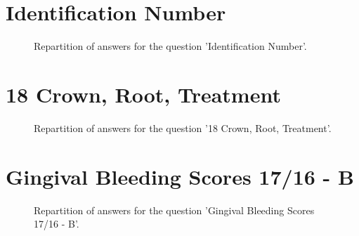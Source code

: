 \documentclass[12pt]{article}
\date{March 30, 2020}
\begin{document}
\clearpage{}
\section{Identification Number}

\label{sec:13}


\begin{figure}[h!]
    \caption{\label{figure:q13-1}Repartition of answers for the question 'Identification Number'.}
\end{figure}



\clearpage{}
\section{18
Crown, Root, Treatment}

\label{sec:25}


\begin{figure}[h!]
    \caption{\label{figure:q25-1}Repartition of answers for the question '18
Crown, Root, Treatment'.}
\end{figure}



\clearpage{}
\section{Gingival Bleeding Scores
17/16 - B}

\label{sec:57}


\begin{figure}[h!]
    \caption{\label{figure:q57-1}Repartition of answers for the question 'Gingival Bleeding Scores
17/16 - B'.}
\end{figure}
\end{document}
